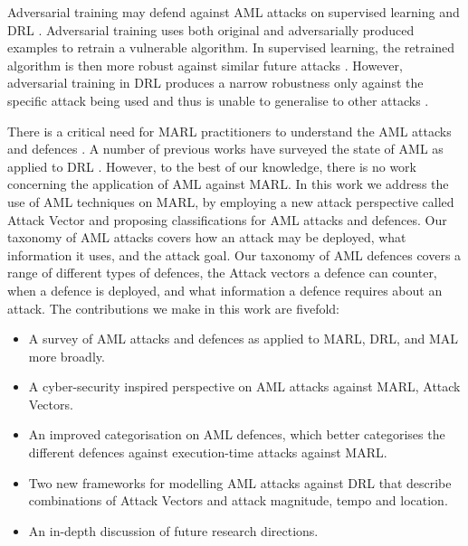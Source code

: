 \documentclass[conference,compsoc]{IEEEtran}
\begin{document}
Adversarial training may defend against AML attacks on supervised learning and DRL \cite{bai_recent_2021}. Adversarial training uses both original and adversarially produced examples to retrain a vulnerable algorithm. In supervised learning, the retrained algorithm is then more robust against similar future attacks \cite{madry_towards_2018}. However, adversarial training in DRL produces a narrow robustness only against the specific attack being used and thus is unable to generalise to other attacks \cite{kos_delving_2017}. 

There is a critical need for MARL practitioners to understand the AML attacks and defences \cite{siva_kumar_adversarial_2020}. A number of previous works have surveyed the state of AML as applied to DRL \cite{ilahi_challenges_2021, chen_adversarial_2019, prorok_beyond_2021, bai_recent_2021, eigner_towards_2021}. However, to the best of our knowledge, there is no work concerning the application of AML against MARL. In this work we address the use of AML techniques on MARL, by employing a new attack perspective called Attack Vector and proposing classifications for AML attacks and defences. Our taxonomy of AML attacks covers how an attack may be deployed, what information it uses, and the attack goal. Our taxonomy of AML defences covers a range of different types of defences, the Attack vectors a defence can counter, when a defence is deployed, and what information a defence requires about an attack. The contributions we make in this work are fivefold:

\begin{itemize}
    \item A survey of AML attacks and defences as applied to MARL, DRL, and MAL more broadly.
    \item A cyber-security inspired perspective on AML attacks against MARL, Attack Vectors.
    \item An improved categorisation on AML defences, which better categorises the different defences against execution-time attacks against MARL.
    \item Two new frameworks for modelling AML attacks against DRL
    that describe combinations of Attack Vectors and attack magnitude,  tempo and location.
    \item An in-depth discussion of future research directions.
\end{itemize} 
\end{document}
